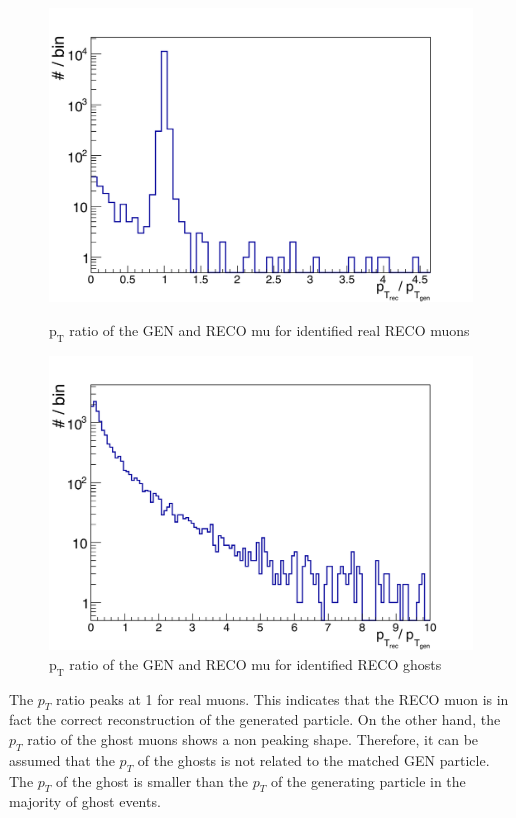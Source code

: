 \begin{figure}[htbp]
\centering
\begin{minipage}[ht]{0.475\textwidth}
\includegraphics[width=\textwidth]{Figures/scheuch/ptRatioRealMu.png}
\caption{$\mathrm{p_{T}}$ ratio of the GEN and RECO mu for identified real RECO muons}
\label{PtRatioReal}
\end{minipage}
\hspace{0.5cm}
\begin{minipage}[ht]{0.475\textwidth}
\includegraphics[width=\textwidth]{Figures/scheuch/ptRatioGhosts.png}
\caption{$\mathrm{p_{T}}$ ratio of the GEN and RECO mu for identified RECO ghosts}
\label{PtRatioGhost}
\end{minipage}
\end{figure}
The $p_{T}$ ratio peaks at 1 for real muons. This indicates that the RECO muon is in fact the correct reconstruction of the generated particle. On the other hand, the $p_{T}$ ratio of the ghost muons shows a non peaking shape. Therefore, it can be assumed that the $p_{T}$ of the ghosts is not related to the matched GEN particle. The $p_{T}$ of the ghost is smaller than the $p_{T}$ of the generating particle in the majority of ghost events.\\
